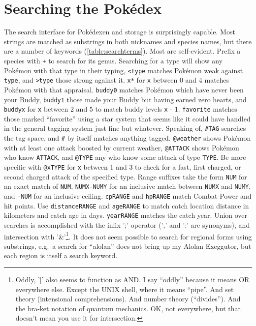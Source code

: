 \section{Searching the Pokédex\label{sec:searching}}
The search interface for Pokédexen and storage is surprisingly capable.
Most strings are matched as substrings in both nicknames and species names,
 but there are a number of keywords (\autoref{table:searchterms}).
Most are self-evident.
Prefix a species with \texttt{+} to search for its genus.
Searching for a type will show any Pokémon with that type in their typing,
 \texttt{<type} matches Pokémon weak against \texttt{type},
 and \texttt{>type} those strong against it.
\texttt{x*} for \texttt{x} between 0 and 4 matches Pokémon with that appraisal.
\texttt{buddy0} matches Pokémon which have never been your Buddy,
 \texttt{buddy1} those made your Buddy but having earned zero hearts,
 and \texttt{buddyx} for \texttt{x} between 2 and 5 to match buddy
 levels \texttt{x} - 1.
\texttt{favorite} matches those marked ``favorite'' using a star system that
 seems like it could have handled in the general tagging system just fine
 but whatever.
Speaking of, \texttt{\#TAG} searches the tag space, and \texttt{\#} by itself
 matches anything tagged.
\texttt{@weather} shows Pokémon with at least one attack boosted by current
 weather, \texttt{@ATTACK} shows Pokémon who know \texttt{ATTACK}, and \texttt{@TYPE}
 any who know some attack of type \texttt{TYPE}.
Be more specific with \texttt{@xTYPE} for \texttt{x} between 1 and 3 to check
  for a fast, first charged, or second charged attack of the specified type.
Range suffixes take the form \texttt{NUM} for an exact match of \texttt{NUM},
  \texttt{NUMX-NUMY} for an inclusive match between \texttt{NUMX} and \texttt{NUMY},
  and \texttt{-NUM} for an inclusive ceiling.
\texttt{cpRANGE} and \texttt{hpRANGE} match Combat Power and hit points.
Use \texttt{distanceRANGE} and \texttt{ageRANGE} to match catch location
  distance in kilometers and catch age in days.
\texttt{yearRANGE} matches the catch year.
Union over searches is accomplished with the infix ';' operator (',' and ':' are synonyms),
  and intersection with '\&'\footnote{Oddly, '|' also seems to function as AND. I say ``oddly'' because it means OR everywhere else.
  Except the UNIX shell, where it means ``pipe''.
  And set theory (intensional comprehensions).
  And number theory (``divides'').
  And the bra-ket notation of quantum mechanics.
  OK, not everywhere, but that doesn't mean you use it for intersection.}.
It does not seem possible to search for regional forms using substrings,
 e.g.\ a search for ``alolan'' does not bring up my Alolan Exeggutor,
 but each region is itself a search keyword.

